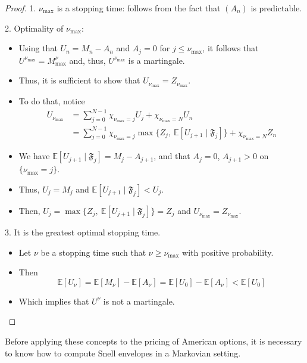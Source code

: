 \begin{proof}
    1. $\nu_{\max}$ is a stopping time: follows from the fact that $(A_n)$ is predictable. 

    2. Optimality of $\nu_{\max}$:
    \begin{itemize}
        \item Using that $U_n = M_n - A_n$ and $A_j = 0$ for $j \le \nu_{\max}$, it follows that $U^{\nu_{\max}} = M^\nu_{\max}$ and, thus, $U^{\nu_{\max}}$ is a martingale.
        \item Thus, it is sufficient to show that $U_{\nu_{\max}} = Z_{\nu_{\max}}$.
        \item To do that, notice 
        \begin{equation*}
            \begin{aligned}
                U_{\nu_{\max}} &= \sum_{j=0}^{N-1} \chi_{\nu_{\max} = j} U_j + \chi_{\nu_{\max} = N} U_n \\ 
                &= \sum_{j=0}^{N-1} \chi_{\nu_{\max} = j} \max \{Z_j, ~\mathbb{E}[U_{j+1} \mid \mathfrak{F}_j]\} + \chi_{\nu_{\max} = N} Z_n
            \end{aligned}
        \end{equation*}
        \item We have $\mathbb{E}[U_{j+1} \mid \mathfrak{F}_j] = M_j - A_{j+1}$, and that $A_j = 0$, $A_{j+1} > 0$ on $\{\nu_{\max} = j\}$.
        \item Thus, $U_j = M_j$ and $\mathbb{E}[U_{j+1} \mid \mathfrak{F}_j] < U_j$.
        \item Then, $U_j = \max \{Z_j, ~\mathbb{E}[U_{j+1} \mid \mathfrak{F}_j]\} = Z_j$ and $U_{\nu_{\max}} = Z_{\nu_{\max}}$.
    \end{itemize}

    3. It is the greatest optimal stopping time.
    \begin{itemize}
        \item Let $\nu$ be a stopping time such that $\nu \ge \nu_{\max}$ with positive probability.
        \item Then 
        \[
            \mathbb{E}[U_\nu] = \mathbb{E}[M_\nu] - \mathbb{E}[A_\nu] = \mathbb{E}[U_0] - \mathbb{E}[A_\nu] < \mathbb{E}[U_0]
        \]
        \item Which implies that $U^\nu$ is not a martingale.
    \end{itemize}
\end{proof}

Before applying these concepts to the pricing of American options, it is necessary to know how to compute Snell envelopes in a Markovian setting.

